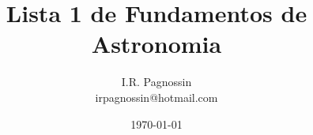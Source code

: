 \documentclass[a4paper,10pt]{article}
\begin{document}
\title{Lista 1 de Fundamentos de Astronomia}
\author{I.R. Pagnossin \\ irpagnossin@hotmail.com}
\date{\today}
\maketitle

 





 





 
\end{document}
